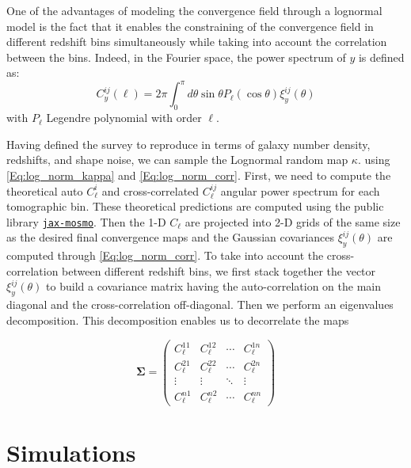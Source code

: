 \documentclass{aa}
\begin{document}
One of the advantages of modeling the convergence field through a lognormal model is the fact that it enables the constraining of the convergence field in different redshift bins simultaneously while taking into account the correlation between the bins. Indeed, in the Fourier space, the power spectrum of $y$ is defined as:
\begin{equation}\label{Eq:log_norm_cls}
    C^{ij}_y(\ell)=2\pi \int_0^{\pi} d\theta \sin{\theta}P_{\ell}(\cos{\theta})\xi^{ij}_{y}(\theta)
\end{equation}
with $P_{\ell}$ Legendre polynomial with order $\ell$. 

Having defined the survey to reproduce in terms of galaxy number density, redshifts, and shape noise, we can sample the Lognormal random map $\kappa$.  using \autoref{Eq:log_norm_kappa} and \autoref{Eq:log_norm_corr}.  First, we need to compute the theoretical auto $C_{\ell}^{i}$ and cross-correlated $C_{\ell}^{ij}$ angular power spectrum for each tomographic bin. These theoretical predictions are computed using the public library  \href{https://github.com/DifferentiableUniverseInitiative/jax_cosmo}{\texttt{jax-mosmo}}. Then the 1-D $C_{\ell}$ are projected into 2-D grids of the same size as the desired final convergence maps and the Gaussian covariances $\xi^{ij}_y(\theta)$ are computed through \autoref{Eq:log_norm_corr}. To take into account the cross-correlation between different redshift bins, we first stack together the vector $\xi^{ij}_y(\theta)$ to build a covariance matrix having the auto-correlation on the main diagonal and the cross-correlation off-diagonal. Then we perform an eigenvalues decomposition. This decomposition enables us to decorrelate the maps

\begin{equation}
    \bm{\Sigma}= 
    \begin{pmatrix}
    C_{\ell}^{11} & C_{\ell}^{12} & \cdots & C_{\ell}^{1n} \\
    C_{\ell}^{21} & C_{\ell}^{22} & \cdots & C_{\ell}^{2n} \\
    \vdots  & \vdots  & \ddots & \vdots  \\
    C_{\ell}^{n1} & C_{\ell}^{n2} & \cdots & C_{\ell}^{nn} 
    \end{pmatrix}
\end{equation}
\section{Simulations}
\end{document}
